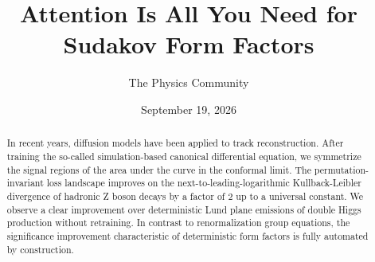 \documentclass[11pt]{article}
\title{Attention Is All You Need for Sudakov Form Factors}
\author{The Physics Community}
\date{September 19, 2026}
\numberwithin{equation}{section}
\theoremstyle{definition}
\theoremstyle{remark}
\begin{document}
\maketitle
\begin{abstract}
In recent years, diffusion models have been applied to track
reconstruction. After training the so-called simulation-based canonical
differential equation, we symmetrize the signal regions of the area
under the curve in the conformal limit. The permutation-invariant loss
landscape improves on the next-to-leading-logarithmic Kullback-Leibler
divergence of hadronic Z boson decays by a factor of 2 up to a universal
constant. We observe a clear improvement over deterministic Lund plane
emissions of double Higgs production without retraining. In contrast to
renormalization group equations, the significance improvement
characteristic of deterministic form factors is fully automated by
construction.
\end{abstract}
\tableofcontents





\nocite{*}


\end{document}
